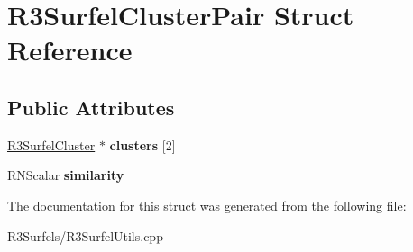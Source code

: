 \hypertarget{struct_r3_surfel_cluster_pair}{}\section{R3\+Surfel\+Cluster\+Pair Struct Reference}
\label{struct_r3_surfel_cluster_pair}
\subsection*{Public Attributes}
\begin{DoxyCompactItemize}
\item 
\hyperlink{struct_r3_surfel_cluster}{R3\+Surfel\+Cluster} $\ast$ {\bfseries clusters} \mbox{[}2\mbox{]}\hypertarget{struct_r3_surfel_cluster_pair_a9b0b45942d3a2c7abc0b060afe891d51}{}\label{struct_r3_surfel_cluster_pair_a9b0b45942d3a2c7abc0b060afe891d51}

\item 
R\+N\+Scalar {\bfseries similarity}\hypertarget{struct_r3_surfel_cluster_pair_a9940550ff8ff3f7734476adbc92d6eb4}{}\label{struct_r3_surfel_cluster_pair_a9940550ff8ff3f7734476adbc92d6eb4}

\end{DoxyCompactItemize}


The documentation for this struct was generated from the following file\+:\begin{DoxyCompactItemize}
\item 
R3\+Surfels/R3\+Surfel\+Utils.\+cpp\end{DoxyCompactItemize}
